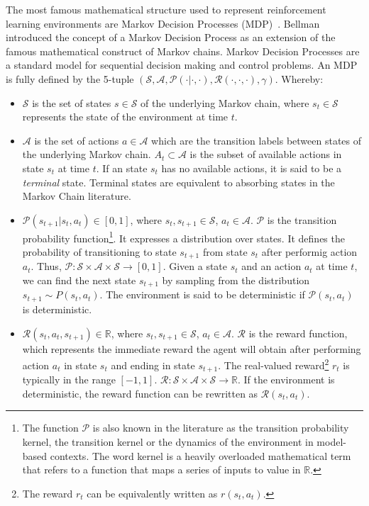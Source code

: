 \documentclass{../main.tex}{}
\begin{document}
The most famous mathematical structure used to represent reinforcement learning environments are Markov Decision Processes (MDP)~\citep{Bellman1957}. Bellman introduced the concept of a Markov Decision Process as an extension of the famous mathematical construct of Markov chains. Markov Decision Processes are a standard model for sequential decision making and control problems. An MDP is fully defined by the 5-tuple $(\mathcal{S}, \mathcal{A}, \mathcal{P(\cdot | \cdot, \cdot)}, \mathcal{R}(\cdot, \cdot, \cdot), \gamma)$. Whereby:

\begin{itemize}
\item $\mathcal{S}$ is the set of states $s \in \mathcal{S}$ of the underlying Markov chain, where $s_t \in \mathcal{S}$ represents the state of the environment at time $t$.
\item $\mathcal{A}$ is the set of actions $a \in \mathcal{A}$ which are the transition labels between states of the underlying Markov chain. $A_t \subset \mathcal{A}$ is the subset of available actions in state $s_t$ at time $t$. If an state $s_t$ has no available actions, it is said to be a \textit{terminal} state. Terminal states are equivalent to absorbing states in the Markov Chain literature.
\item $\mathcal{P}(s_{t+1} | s_t, a_t) \in [0, 1]$, where $s_t, s_{t+1} \in \mathcal{S}$, $a_t \in \mathcal{A}$. $\mathcal{P}$ is the transition probability function\footnote{The function $\mathcal{P}$ is also known in the literature as the transition probability kernel, the transition kernel or the dynamics of the environment in model-based contexts. The word kernel is a heavily overloaded mathematical term that refers to a function that maps a series of inputs to value in $\mathbb{R}$.}. It expresses a distribution over states. It defines the probability of transitioning to state $s_{t+1}$ from state $s_t$ after performig action $a_t$. Thus, $\mathcal{P}: \mathcal{S} \times \mathcal{A} \times \mathcal{S} \to [0,1]$. Given a state $s_t$ and an action $a_t$ at time $t$, we can find the next state $s_{t+1}$ by sampling from the distribution $s_{t+1} \sim P(s_t, a_t)$. The environment is said to be deterministic if $\mathcal{P}(s_t, a_t)$ is deterministic.%
\item $\mathcal{R}(s_t, a_t, s_{t+1}) \in \mathbb{R}$, where $s_t, s_{t+1} \in \mathcal{S}$, $a_t \in \mathcal{A}$. $\mathcal{R}$ is the reward function, which represents the immediate reward the agent will obtain after performing action $a_t$ in state $s_t$ and ending in state $s_{t+1}$. The real-valued reward\footnote{The reward $r_t$ can be equivalently written as $r(s_t, a_t)$.} $r_t$ is typically in the range $[-1,1]$. $\mathcal{R}: \mathcal{S} \times \mathcal{A} \times \mathcal{S} \to \mathbb{R}$. If the environment is deterministic, the reward function can be rewritten as $\mathcal{R}(s_t, a_t)$.

\end{itemize}
\end{document}
